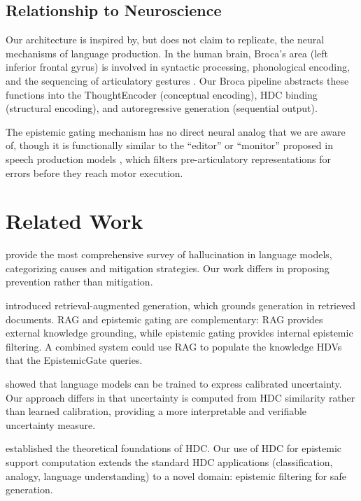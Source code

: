 \documentclass[12pt,a4paper]{article}
\begin{document}
\subsection{Relationship to Neuroscience}

Our architecture is inspired by, but does not claim to replicate, the neural mechanisms of language production. In the human brain, Broca's area (left inferior frontal gyrus) is involved in syntactic processing, phonological encoding, and the sequencing of articulatory gestures \citep{hagoort2005broca}. Our Broca pipeline abstracts these functions into the ThoughtEncoder (conceptual encoding), HDC binding (structural encoding), and autoregressive generation (sequential output).

The epistemic gating mechanism has no direct neural analog that we are aware of, though it is functionally similar to the ``editor'' or ``monitor'' proposed in speech production models \citep{levelt1989speaking}, which filters pre-articulatory representations for errors before they reach motor execution.

\section{Related Work}

\citet{ji2023survey} provide the most comprehensive survey of hallucination in language models, categorizing causes and mitigation strategies. Our work differs in proposing prevention rather than mitigation.

\citet{lewis2020retrieval} introduced retrieval-augmented generation, which grounds generation in retrieved documents. RAG and epistemic gating are complementary: RAG provides external knowledge grounding, while epistemic gating provides internal epistemic filtering. A combined system could use RAG to populate the knowledge HDVs that the EpistemicGate queries.

\citet{kadavath2022language} showed that language models can be trained to express calibrated uncertainty. Our approach differs in that uncertainty is computed from HDC similarity rather than learned calibration, providing a more interpretable and verifiable uncertainty measure.

\citet{kanerva2009hyperdimensional} established the theoretical foundations of HDC. Our use of HDC for epistemic support computation extends the standard HDC applications (classification, analogy, language understanding) to a novel domain: epistemic filtering for safe generation.
\end{document}
